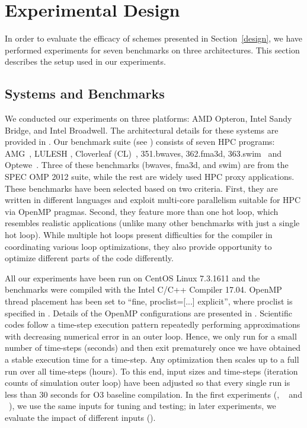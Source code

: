 \section{Experimental Design} \label{experiment design}

In order to evaluate the efficacy of schemes presented in
Section~\ref{design}, we have performed experiments for seven benchmarks
on three architectures. This section describes the
setup used in our experiments.

\subsection{Systems and Benchmarks}

We conducted our experiments on three platforms: AMD Opteron, Intel Sandy Bridge,
and Intel Broadwell.  The architectural
details for these systems are provided in .
Our benchmark suite (see ) consists of seven
HPC programs: AMG~\cite{amg2013}, LULESH
\cite{LULESH}, Cloverleaf (CL)~\cite{cloverleaf}, 351.bwaves, 362.fma3d,
363.swim~\cite{specomp2012} and Optewe~\cite{sc2017}.  Three of these benchmarks (bwaves, fma3d, and
swim) are from the SPEC OMP 2012 suite, while the rest are widely used HPC
proxy applications.  These benchmarks have been
selected based on two criteria.  First, they are written in different
languages and exploit multi-core parallelism suitable for HPC via
OpenMP pragmas.  Second, they feature more than one hot loop, which
resembles realistic applications (unlike many other benchmarks with
just a single hot loop). While multiple hot loops present difficulties
for the compiler in coordinating various loop optimizations,
they also provide opportunity to optimize different parts of the code differently.
%

All our experiments have been run on CentOS Linux 7.3.1611 and the benchmarks
were compiled
with the Intel C/C++ Compiler 17.04. OpenMP thread placement has been set to
``fine, proclist=[...] explicit'', where proclist is specified in .
%
Details of the OpenMP configurations are presented in .
Scientific codes follow a time-step execution pattern repeatedly
performing approximations with decreasing numerical error in an outer
loop. Hence, we only run for a small number of time-steps (seconds)
and then exit prematurely once we have obtained a stable execution
time for a time-step. Any optimization then scales up to a full run
over all time-steps (hours). To this end, input sizes and time-steps
(iteration counts of simulation outer loop) have been adjusted so that
every single run is less than 30 seconds for O3 baseline
compilation. In the first experiments (, ~ and ~), we use the same inputs for
tuning and testing; in later experiments, we evaluate the impact of
different inputs ().

